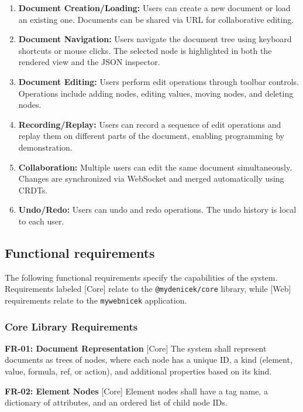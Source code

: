 \documentclass{article}
\begin{document}
\begin{enumerate}
\item \textbf{Document Creation/Loading:} Users can create a new document or load an existing one. Documents can be shared via URL for collaborative editing.

\item \textbf{Document Navigation:} Users navigate the document tree using keyboard shortcuts or mouse clicks. The selected node is highlighted in both the rendered view and the JSON inspector.

\item \textbf{Document Editing:} Users perform edit operations through toolbar controls. Operations include adding nodes, editing values, moving nodes, and deleting nodes.

\item \textbf{Recording/Replay:} Users can record a sequence of edit operations and replay them on different parts of the document, enabling programming by demonstration.

\item \textbf{Collaboration:} Multiple users can edit the same document simultaneously. Changes are synchronized via WebSocket and merged automatically using CRDTs.

\item \textbf{Undo/Redo:} Users can undo and redo operations. The undo history is local to each user.
\end{enumerate}


\subsection{Functional requirements}

The following functional requirements specify the capabilities of the system. Requirements labeled [Core] relate to the \texttt{@mydenicek/core} library, while [Web] requirements relate to the \texttt{mywebnicek} application.

\subsubsection{Core Library Requirements}

\textbf{FR-01: Document Representation} [Core] The system shall represent documents as trees of nodes, where each node has a unique ID, a kind (element, value, formula, ref, or action), and additional properties based on its kind.

\textbf{FR-02: Element Nodes} [Core] Element nodes shall have a tag name, a dictionary of attributes, and an ordered list of child node IDs.
\end{document}

